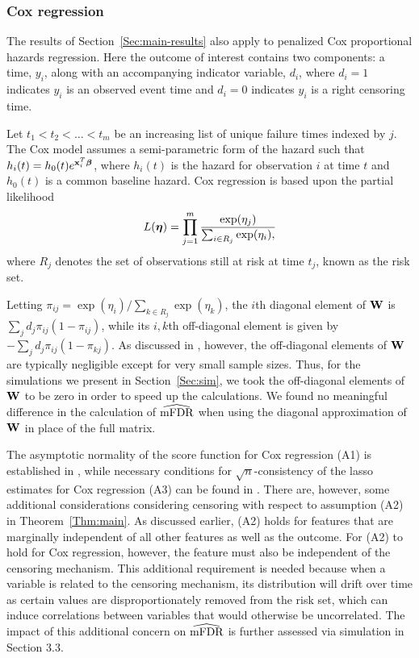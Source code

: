 \subsubsection{Cox regression}
\label{Sec:cox}

The results of Section~\ref{Sec:main-results} also apply to penalized Cox proportional hazards regression. Here the outcome of interest contains two components: a time, $y_i$, along with an accompanying indicator variable, $d_i$, where $d_i = 1$ indicates $y_i$ is an observed event time and $d_i = 0$ indicates $y_i$ is a right censoring time.

Let $t_1 < t_2 < \ldots < t_m$ be an increasing list of unique failure times indexed by $j$. The Cox model assumes a semi-parametric form of the hazard such that $h_i(t) = h_0(t)e^{\mathbf{x}_i^T \boldsymbol{\beta}}$, where $h_i(t)$ is the hazard for observation $i$ at time $t$ and $h_0(t)$ is a common baseline hazard. Cox regression is based upon the partial likelihood \citep{Cox1972}
\begin{equation*}
L(\boldsymbol{\eta})  = \prod_{j=1}^{m} \frac{\exp(\eta_j)}{\sum_{i \in R_j} \exp(\eta_i),} 
\end{equation*}
where $R_j$ denotes the set of observations still at risk at time $t_j$, known as the risk set.

Letting $\pi_{ij} = \exp(\eta_i)/\sum_{k \in R_j}\exp(\eta_k)$, the $i$th diagonal element of $\mathbf{W}$ is $\sum_j d_j\pi_{ij}(1-\pi_{ij})$, while its $i,k$th off-diagonal element is given by $-\sum_j d_j\pi_{ij}(1-\pi_{kj})$.  As discussed in \citet{Simon2011}, however, the off-diagonal elements of $\mathbf{W}$ are typically negligible except for very small sample sizes.  Thus, for the simulations we present in Section~\ref{Sec:sim}, we took the off-diagonal elements of $\mathbf{W}$ to be zero in order to speed up the calculations.  We found no meaningful difference in the calculation of $\widehat{\textrm{mFDR}}$ when using the diagonal approximation of $\mathbf{W}$ in place of the full matrix.

The asymptotic normality of the score function for Cox regression (A1) is established in \citet{Andersen1982}, while necessary conditions for $\sqrt{n}$-consistency of the lasso estimates for Cox regression (A3) can be found in \citet{Fan_scad}.  There are, however, some additional considerations considering censoring with respect to assumption (A2) in Theorem~\ref{Thm:main}.  As discussed earlier, (A2) holds for features that are marginally independent of all other features as well as the outcome.  For (A2) to hold for Cox regression, however, the feature must also be independent of the censoring mechanism.  This additional requirement is needed because when a variable is related to the censoring mechanism, its distribution will drift over time as certain values are disproportionately removed from the risk set, which can induce correlations between variables that would otherwise be uncorrelated. The impact of this additional concern on $\widehat{\textrm{mFDR}}$ is further assessed via simulation in Section 3.3. 

